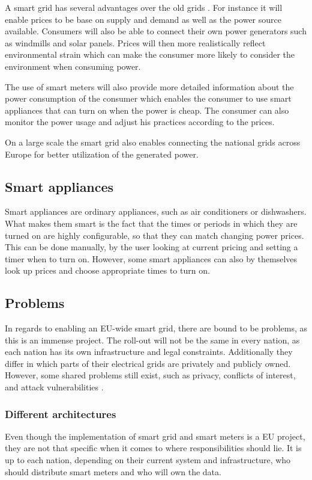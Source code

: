 A smart grid has several advantages over the old grids \cite{smartgrid_gov, directive_2009_72_EC}.
For instance it will enable prices to be base on supply and demand as well as the power source available.
Consumers will also be able to connect their own power generators such as windmills and solar panels.
Prices will then more realistically reflect environmental strain which can make the consumer more likely to consider the environment when consuming power.

The use of smart meters will also provide more detailed information about the power consumption of the consumer which enables the consumer to use smart appliances that can turn on when the power is cheap.
The consumer can also monitor the power usage and adjust his practices according to the prices.

On a large scale the smart grid also enables connecting the national grids across Europe for better utilization of the generated power.


\subsection{Smart appliances}
\label{background:smart_appliances}
Smart appliances\cite{smart_appliances} are ordinary appliances, such as air conditioners or dishwashers.
What makes them smart is the fact that the times or periods in which they are turned on are highly configurable, so that they can match changing power prices.
This can be done manually, by the user looking at current pricing and setting a timer when to turn on.
However, some smart appliances can also by themselves look up prices and choose appropriate times to turn on.

\subsection{Problems}
In regards to enabling an EU-wide smart grid, there are bound to be problems, as this is an immense project.
The roll-out will not be the same in every nation, as each nation has its own infrastructure and legal constraints.
Additionally they differ in which parts of their electrical grids are privately and publicly owned.
However, some shared problems still exist, such as privacy, conflicts of interest, and attack vulnerabilities \cite{offswitch, smart_meter_survey, security_economics}.

\subsubsection{Different architectures}
Even though the implementation of smart grid and smart meters is a EU project, they are not that specific when it comes to where responsibilities should lie.
It is up to each nation, depending on their current system and infrastructure, who should distribute smart meters and who will own the data.

